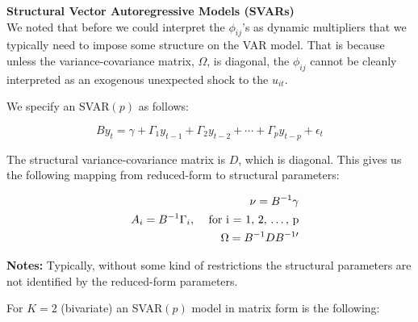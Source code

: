 \documentclass[11pt]{article}
\begin{document}
\vspace{10mm}
\textbf{Structural Vector Autoregressive Models (SVARs)} \\

\vspace{3.5mm}
We noted that before we could interpret the $\phi_{ij}$'s as dynamic multipliers that we typically need
to impose some structure on the VAR model. That is because unless the variance-covariance matrix, $\Omega$, 
is diagonal, the $\phi_{ij}$ cannot be cleanly interpreted as an exogenous unexpected shock to the $u_{it}$.


\vspace{3.5mm}
We specify an SVAR$(p)$ as follows:

\vspace{2mm}
\begin{equation*}
B y_{t} = \gamma + \Gamma_{1} y_{t-1} + \Gamma_{2} y_{t-2} + \cdots + \Gamma_{p} y_{t-p} + \epsilon_{t}
\end{equation*}

The structural variance-covariance matrix is $D$, which is diagonal. This gives us the following mapping
from reduced-form to structural parameters:

\vspace{2mm}
\begin{eqnarray*}
&& \nu = B^{-1} \gamma \\
&& A_{i} = B^{-1} \Gamma_{i} \mbox{, \quad for i = 1, 2, \ldots, p} \\
&& \Omega = B^{-1} D B^{-1 \prime}
\end{eqnarray*}

\vspace{3.5mm}
\textbf{Notes:} Typically, without some kind of restrictions the structural parameters are not identified
by the reduced-form parameters.

\vspace{3.5mm}
For $K=2$ (bivariate) an SVAR$(p)$ model in matrix form is the following:
\end{document}
